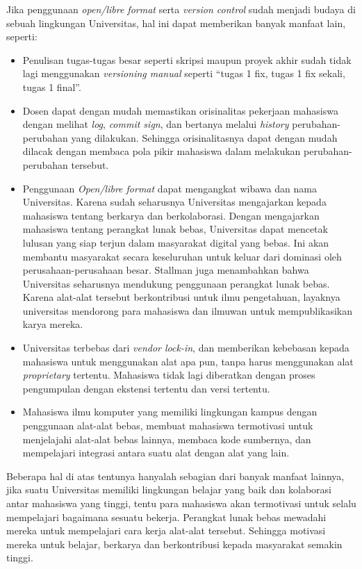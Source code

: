 \documentclass[a4paper,11pt]{article}
\begin{document}
Jika penggunaan \emph{open/libre format} serta \emph{version control}
sudah menjadi budaya di sebuah lingkungan Universitas, hal ini dapat
memberikan banyak manfaat lain, seperti:

\begin{itemize}
\item Penulisan tugas-tugas besar seperti skripsi maupun proyek akhir
  sudah tidak lagi menggunakan \emph{versioning manual} seperti ``tugas
  1 fix, tugas 1 fix sekali, tugas 1 final''.
\item Dosen dapat dengan mudah memastikan orisinalitas pekerjaan
  mahasiswa dengan melihat \emph{log}, \emph{commit
    sign}\cite{gitbook2}, dan bertanya melalui \emph{history}
  perubahan-perubahan yang dilakukan. Sehingga orisinalitasnya dapat
  dengan mudah dilacak dengan membaca pola pikir mahasiswa dalam
  melakukan perubahan-perubahan tersebut.
\item Penggunaan \emph{Open/libre format} dapat mengangkat wibawa dan
  nama Universitas.  Karena sudah seharusnya Universitas mengajarkan
  kepada mahasiswa tentang berkarya dan berkolaborasi. Dengan
  mengajarkan mahasiswa tentang perangkat lunak bebas, Universitas dapat
  mencetak lulusan yang siap terjun dalam masyarakat digital yang
  bebas. Ini akan membantu masyarakat secara keseluruhan untuk keluar
  dari dominasi oleh perusahaan-perusahaan besar\cite{stallman03}.
  Stallman juga menambahkan bahwa Universitas seharusnya mendukung
  penggunaan perangkat lunak bebas. Karena alat-alat tersebut
  berkontribusi untuk ilmu pengetahuan, layaknya universitas mendorong
  para mahasiswa dan ilmuwan untuk mempublikasikan karya mereka.
\item Universitas terbebas dari \emph{vendor lock-in}, dan memberikan
  kebebasan kepada mahasiswa untuk menggunakan alat apa pun, tanpa
  harus menggunakan alat \emph{proprietary}\cite{wiki-nonfs} tertentu. Mahasiswa tidak
  lagi diberatkan dengan proses pengumpulan dengan ekstensi tertentu dan
  versi tertentu.
\item Mahasiswa ilmu komputer yang memiliki lingkungan kampus dengan penggunaan
  alat-alat bebas, membuat mahasiswa termotivasi untuk menjelajahi alat-alat
  bebas lainnya, membaca kode sumbernya, dan mempelajari integrasi antara suatu
  alat dengan alat yang lain.
\end{itemize}

Beberapa hal di atas tentunya hanyalah sebagian dari banyak manfaat
lainnya, jika suatu Universitas memiliki lingkungan belajar yang baik
dan kolaborasi antar mahasiswa yang tinggi, tentu para mahasiswa akan
termotivasi untuk selalu mempelajari bagaimana sesuatu
bekerja. Perangkat lunak bebas mewadahi mereka untuk mempelajari cara
kerja alat-alat tersebut. Sehingga motivasi mereka untuk belajar,
berkarya dan berkontribusi kepada masyarakat semakin tinggi.
\end{document}

